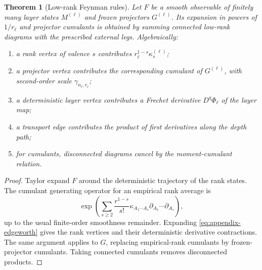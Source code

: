 \documentclass{article}
\newtheorem{theorem}{Theorem}[section]
\begin{document}
\begin{theorem}[Low-rank Feynman rules]
\label{thm:lowrank-feynman-rules}
Let \(F\) be a smooth observable of finitely many layer states \(M^{(\ell)}\) and frozen projectors \(G^{(\ell)}\). Its expansion in powers of \(1/r_\ell\) and projector cumulants is obtained by summing connected low-rank diagrams with the prescribed external legs. Algebraically:
\begin{enumerate}[leftmargin=1.5em]
\item a rank vertex of valence \(s\) contributes \(r_\ell^{1-s}\kappa_s^{(\ell)}\);
\item a projector vertex contributes the corresponding cumulant of \(G^{(\ell)}\), with second-order scale \(\gamma_{n_\ell,r_\ell}\);
\item a deterministic layer vertex contributes a Frechet derivative \(D^q\Phi_\ell\) of the layer map;
\item a transport edge contributes the product of first derivatives along the depth path;
\item for cumulants, disconnected diagrams cancel by the moment-cumulant relation.
\end{enumerate}
\end{theorem}

\begin{proof}
Taylor expand \(F\) around the deterministic trajectory of the rank states. The cumulant generating operator for an empirical rank average is
\begin{equation}
\exp\left(
\sum_{s\ge2}\frac{r^{1-s}}{s!}
\kappa_{A_1\cdots A_s}
\partial_{A_1}\cdots\partial_{A_s}
\right),
\label{eq:appendix-edgeworth}
\end{equation}
up to the usual finite-order smoothness remainder. Expanding \eqref{eq:appendix-edgeworth} gives the rank vertices and their deterministic derivative contractions. The same argument applies to \(G\), replacing empirical-rank cumulants by frozen-projector cumulants. Taking connected cumulants removes disconnected products.
\end{proof}
\end{document}
